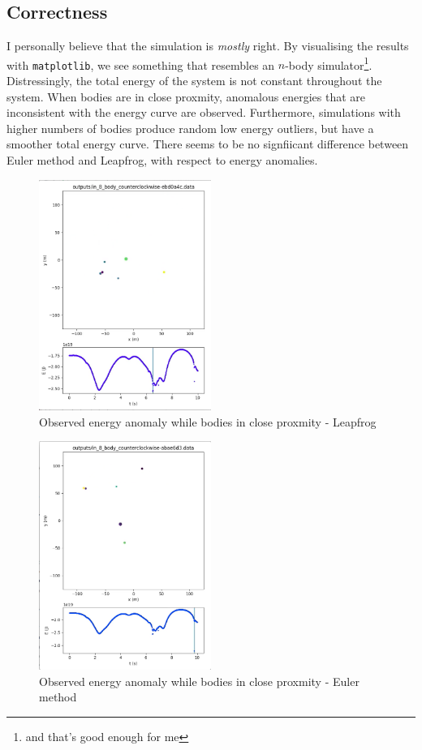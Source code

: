 \documentclass[11pt,a4paper]{article}
\begin{document}
\subsection*{Correctness}

I personally believe that the simulation is \textit{mostly} right. By visualising the results with \texttt{matplotlib}, we see something that resembles an $n$-body simulator\footnote{and that's good enough for me}. Distressingly, the total energy of the system is not constant throughout the system. When bodies are in close proxmity, anomalous energies that are inconsistent with the energy curve are observed. Furthermore, simulations with higher numbers of bodies produce random low energy outliers, but have a smoother total energy curve. There seems to be no signfiicant difference between Euler method and Leapfrog, with respect to energy anomalies.


\begin{figure}[b]
\caption{Observed energy anomaly while bodies in close proxmity - Leapfrog}
\centering
\includegraphics[width=0.5\textwidth]{energy_anomaly}
\end{figure} 

\begin{figure}[b]
\caption{Observed energy anomaly while bodies in close proxmity - Euler method}
\centering
\includegraphics[width=0.5\textwidth]{euler_energy_anomaly}
\end{figure} 
\end{document}
